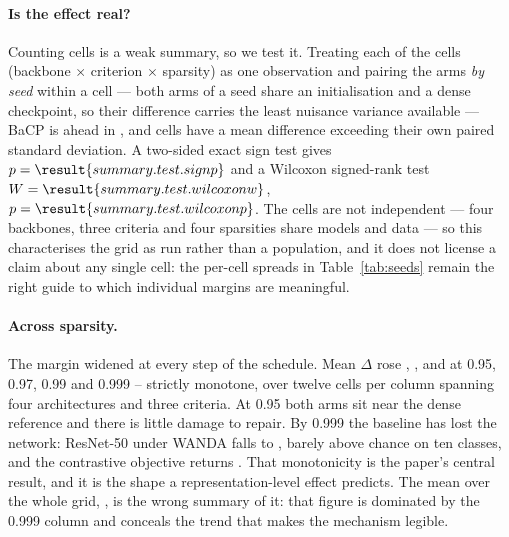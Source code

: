 \paragraph{Is the effect real?}
Counting cells is a weak summary, so we test it. Treating each of the
 cells (backbone $\times$ criterion $\times$
sparsity) as one observation and pairing the arms \emph{by seed} within a
cell --- both arms of a seed share an initialisation and a dense checkpoint,
so their difference carries the least nuisance variance available --- BaCP is
ahead in , and
 cells have a mean difference exceeding their own
paired standard deviation. A two-sided exact sign test gives
$p = \result{summary.test.signp}$ and a Wilcoxon signed-rank test
$W = \result{summary.test.wilcoxonw}$, $p = \result{summary.test.wilcoxonp}$.
The cells are not independent --- four backbones, three criteria and four
sparsities share models and data --- so this characterises the grid as run
rather than a population, and it does not license a claim about any single
cell: the per-cell spreads in Table~\ref{tab:seeds} remain the right guide to
which individual margins are meaningful.

\paragraph{Across sparsity.}
The margin widened at every step of the schedule. Mean $\Delta$ rose
, ,
 and
 at 0.95, 0.97, 0.99 and 0.999 --
strictly monotone, over twelve cells per column spanning four architectures
and three criteria. At 0.95 both arms sit near the dense reference and there
is little damage to repair. By 0.999 the baseline has lost the network:
ResNet-50 under WANDA falls to , barely above
chance on ten classes, and the contrastive objective returns
. That monotonicity is the paper's central
result, and it is the shape a representation-level effect predicts. The mean
over the whole grid, , is the wrong summary of it:
that figure is dominated by the 0.999 column and conceals the trend that makes
the mechanism legible.

